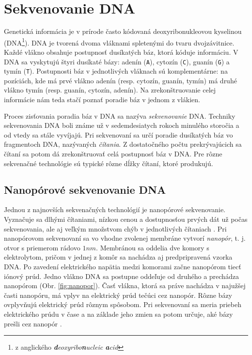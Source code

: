 \chapter{Sekvenovanie DNA}

\label{kap:sekvenovanie}

Genetická informácia je v prírode často kódovaná deoxyribonukleovou kyselinou (DNA\footnote{z anglického 
\emph{\textbf{d}eoxyribo\textbf{n}ucleic \textbf{a}cid}}). DNA je tvorená dvoma vláknami spletenými
do tvaru dvojzávitnice. Každé vlákno obsahuje postupnosť dusíkatých báz, ktorá kóduje informáciu. V DNA 
sa 
vyskytujú štyri
dusíkaté bázy: adenín (\texttt{A}), cytozín (\texttt{C}), guanín (\texttt{G}) a tymín (\texttt{T}). Postupnosti báz v jednotlivých vláknach 
sú 
komplementárne: na pozíciách, kde má prvé vlákno adenín 
(resp. cytozín, guanín, tymín) má druhé vlákno tymín (resp. guanín, cytozín, adenín). Na 
zrekonštruovanie 
celej informácie nám teda stačí poznať poradie báz v jednom z vlákien.

Proces zisťovania poradia báz v DNA sa nazýva \emph{sekvenovanie} DNA. Techniky sekvenovania DNA
boli známe už v sedemdesiatych rokoch minulého storočia a od vtedy sa stále vyvíjajú. Pri sekvenovaní
sa určí poradie dusíkatých báz vo fragmentoch DNA, nazývaných \emph{čítania}. Z dostatočného počtu 
prekrývajúcich sa čítaní sa potom dá zrekonštruovať celá postupnosť báz v DNA. Pre rôzne sekvenačné 
technológie sú typické rôzne dĺžky čítaní, ktoré produkujú.

\section{Nanopórové sekvenovanie DNA}

Jednou z najnovších sekvenačných technológií je nanopórové sekvenovanie. Vyznačuje sa dlhými čítaniami,
nízkou cenou a dostupnosťou prvých dát už počas sekvenovania, ale aj veľkým množstvom chýb v 
jednotlivých čítaniach \cite{Laver2015}. Pri nanopórovom sekvenovaní sa vo vhodne zvolenej membráne vytvorí 
\emph{nanopór}, t. j. otvor s priemerom rádovo $1 \si{nm}$. Membránou sa oddelia dve komory s 
elektrolytom, pričom v jednej z komôr sa nachádza aj predpripravená vzorka DNA.
Po zavedení elektrického napätia medzi komorami začne nanopórom tiecť iónový prúd. Jedno vlákno DNA
 sa postupne oddeľuje od druhého a prechádza nanopórom (Obr. \ref{fig:nanopor}). Časť vlákna, 
ktorá sa práve nachádza v najužšej časti nanopóru, má vplyv na elektrický prúd tečúci cez nanopór. Rôzne 
bázy ovplyvňujú elektrický prúd rôznym spôsobom. Pri sekvenovaní sa meria priebeh elektrického prúdu v 
čase a na základe jeho zmien sa potom určuje, aké bázy prešli cez nanopór \cite{Branton2008}.

